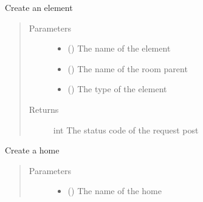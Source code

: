 \documentclass[letterpaper,10pt,english]{sphinxmanual}
\begin{document}
\begin{fulllineitems}
\begin{fulllineitems}
\label{\detokenize{index:Api.Api.create_element}}
\sphinxAtStartPar
Create an element
\begin{quote}\begin{description}
\item[{Parameters}] \leavevmode\begin{itemize}
\item {} 
\sphinxAtStartPar
{} () \textendash{} The name of the element

\item {} 
\sphinxAtStartPar
{} () \textendash{} The name of the room parent

\item {} 
\sphinxAtStartPar
{} () \textendash{} The type of the element

\end{itemize}

\item[{Returns}] \leavevmode
\sphinxAtStartPar
int \textendash{} The status code of the request post

\end{description}\end{quote}

\end{fulllineitems}


\begin{fulllineitems}
\label{\detokenize{index:Api.Api.create_home}}
\sphinxAtStartPar
Create a home
\begin{quote}\begin{description}
\item[{Parameters}] \leavevmode\begin{itemize}
\item {} 
\sphinxAtStartPar
{} () \textendash{} The name of the home


\end{itemize}
\end{description}
\end{quote}
\end{fulllineitems}
\end{fulllineitems}
\end{document}
